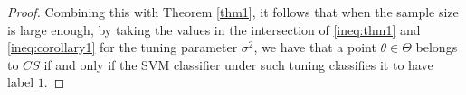 \documentclass[12pt]{article}
\theoremstyle{definition}
\begin{document}
\begin{appendices}
\begin{proof}
Combining this with Theorem \ref{thm1}, it follows that when the sample size is large enough, by taking the values in the intersection of \ref{ineq:thm1} and \ref{ineq:corollary1} for the tuning parameter $\sigma^2$, we have that a point 
$\theta\in\Theta$ belongs to $CS$ if and only if the SVM classifier under such tuning classifies it to have label $1$.
\end{proof}

\end{appendices}


\end{document}
